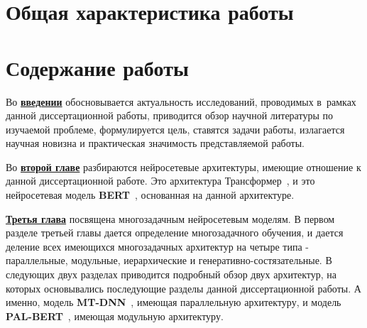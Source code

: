 \section*{Общая характеристика работы}

\newcommand{\actuality}{\underline{\textbf{\actualityTXT}}}
\newcommand{\progress}{\underline{\textbf{\progressTXT}}}
\newcommand{\aim}{\underline{{\textbf\aimTXT}}}
\newcommand{\tasks}{\underline{\textbf{\tasksTXT}}}
\newcommand{\novelty}{\underline{\textbf{\noveltyTXT}}}
\newcommand{\influence}{\underline{\textbf{\influenceTXT}}}
\newcommand{\methods}{\underline{\textbf{\methodsTXT}}}
\newcommand{\defpositions}{\underline{\textbf{\defpositionsTXT}}}
\newcommand{\reliability}{\underline{\textbf{\reliabilityTXT}}}
\newcommand{\probation}{\underline{\textbf{\probationTXT}}}
\newcommand{\contribution}{\underline{\textbf{\contributionTXT}}}
\newcommand{\publications}{\underline{\textbf{\publicationsTXT}}}




\section*{Содержание работы}
Во \underline{\textbf{введении}} обосновывается актуальность
исследований, проводимых в~рамках данной диссертационной работы,
приводится обзор научной литературы по изучаемой проблеме,
формулируется цель, ставятся задачи работы, излагается научная новизна
и практическая значимость представляемой работы. 

Во \underline{\textbf{второй главе}} разбираются нейросетевые архитектуры, имеющие отношение к данной диссертационной работе. Это архитектура Трансформер~\cite{vaswani_2017}, и это нейросетевая модель \textbf{BERT}~\cite{devlin_2018}, основанная на данной архитектуре.

\underline{\textbf{Третья глава}} посвящена многозадачным нейросетевым моделям. В первом разделе третьей главы дается определение многозадачного обучения, и дается деление всех имеющихся многозадачных архитектур на четыре типа - параллельные, модульные, иерархические и генеративно-состязательные. В следующих двух разделах приводится подробный обзор двух архитектур, на которых основывались последующие разделы данной диссертационной работы. А именно, модель \textbf{MT-DNN}~\cite{mtdnn}, имеющая параллельную архитектуру, и модель \textbf{PAL-BERT}~\cite{stickland_2019}, имеющая модульную архитектуру. 

